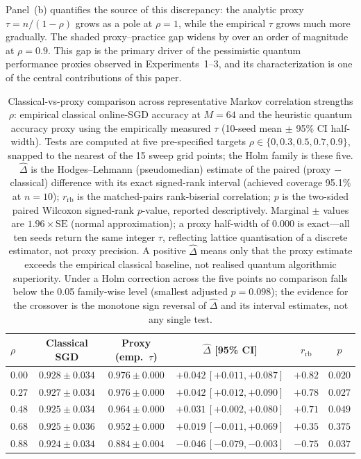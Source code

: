 \documentclass[sensors,article,submit,pdftex,moreauthors]{Definitions/mdpi}
\begin{document}
Panel~(b) quantifies the source of this discrepancy: the analytic proxy $\tau = n/(1{-}\rho)$ grows as a pole at $\rho = 1$, while the empirical $\tau$ grows much more gradually. The shaded proxy--practice gap widens by over an order of magnitude at $\rho = 0.9$. This gap is the primary driver of the pessimistic quantum performance proxies observed in Experiments~1--3, and its characterization is one of the central contributions of this paper.

\begin{table}[t]
\centering
\caption{Classical-vs-proxy comparison across representative Markov correlation strengths $\rho$: empirical classical online-SGD accuracy at $M = 64$ and the heuristic quantum accuracy proxy using the empirically measured $\tau$ (10-seed mean $\pm$ 95\% CI half-width). Tests are computed at five pre-specified targets $\rho \in \{0, 0.3, 0.5, 0.7, 0.9\}$, snapped to the nearest of the 15 sweep grid points; the Holm family is these five. $\hat{\Delta}$ is the Hodges--Lehmann (pseudomedian) estimate of the paired (proxy $-$ classical) difference with its exact signed-rank interval (achieved coverage 95.1\% at $n = 10$); $r_{\mathrm{rb}}$ is the matched-pairs rank-biserial correlation; $p$ is the two-sided paired Wilcoxon signed-rank $p$-value, reported descriptively. Marginal $\pm$ values are $1.96 \times \mathrm{SE}$ (normal approximation); a proxy half-width of $0.000$ is exact---all ten seeds return the same integer $\tau$, reflecting lattice quantisation of a discrete estimator, not proxy precision. A positive $\hat{\Delta}$ means only that the proxy estimate exceeds the empirical classical baseline, not realised quantum algorithmic superiority. Under a Holm correction across the five points no comparison falls below the 0.05 family-wise level (smallest adjusted $p = 0.098$); the evidence for the crossover is the monotone sign reversal of $\hat{\Delta}$ and its interval estimates, not any single test.}
\label{tab:markov_summary}
\begin{tabular}{lccccc}
\hline
$\rho$ & Classical SGD & Proxy (emp.\ $\tau$) & $\hat{\Delta}$ [95\% CI] & $r_{\mathrm{rb}}$ & $p$ \\
\hline
$0.00$ & $0.928 \pm 0.034$ & $0.976 \pm 0.000$ & $+0.042\,[+0.011, +0.087]$ & $+0.82$ & $0.020$ \\
$0.27$ & $0.927 \pm 0.034$ & $0.976 \pm 0.000$ & $+0.042\,[+0.012, +0.090]$ & $+0.78$ & $0.027$ \\
$0.48$ & $0.925 \pm 0.034$ & $0.964 \pm 0.000$ & $+0.031\,[+0.002, +0.080]$ & $+0.71$ & $0.049$ \\
$0.68$ & $0.925 \pm 0.036$ & $0.952 \pm 0.000$ & $+0.019\,[-0.011, +0.069]$ & $+0.35$ & $0.375$ \\
$0.88$ & $0.924 \pm 0.034$ & $0.884 \pm 0.004$ & $-0.046\,[-0.079, -0.003]$ & $-0.75$ & $0.037$ \\
\hline
\end{tabular}
\end{table}
\end{document}
